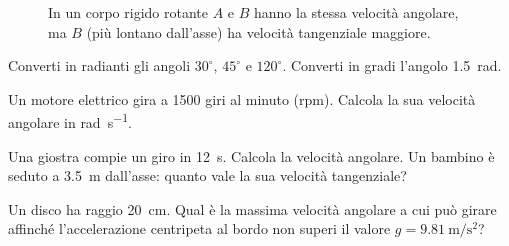 \begin{figure}[!htbp]
    \centering
    \caption{In un corpo rigido rotante $A$ e $B$ hanno la stessa velocità angolare, ma $B$ (più lontano dall'asse) ha velocità tangenziale maggiore.}
    \label{fig:corpo-rigido}
\end{figure}

\begin{esercizio}
Converti in radianti gli angoli $30^\circ $, $45^\circ $ e $120^\circ $. Converti in gradi l'angolo \SI{1,5}{\radian}.\\
\end{esercizio}

\begin{esercizio}
Un motore elettrico gira a \SI{1500}{} giri al minuto (rpm). Calcola la sua velocità angolare in \si{\radian\per\second}.\\
\end{esercizio}

\begin{esercizio}
Una giostra compie un giro in \SI{12}{\second}. Calcola la velocità angolare. Un bambino è seduto a \SI{3,5}{\metre} dall'asse: quanto vale la sua velocità tangenziale?\\
\end{esercizio}

\begin{esercizio}
Un disco ha raggio \SI{20}{\centi\metre}. Qual è la massima velocità angolare a cui può girare affinché l'accelerazione centripeta al bordo non superi il valore $g = \SI{9,81}{\metre\per\second\squared}$?\\
\end{esercizio}

